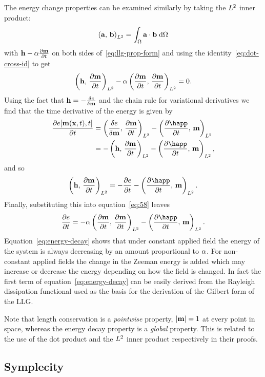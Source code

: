 The energy change properties can be examined similarly by taking the $L^2$ inner product:
\begin{equation}
  \left({\mathbf{a}},\, {\mathbf{b}} \right)_{L^2} = \int_\Omega {\mathbf{a}} \cdot {\mathbf{b}} {\; \text{d}}\Omega
\end{equation}
with $\mathbf{h} - \alpha \frac{\partial \mathbf{m}}{\partial t}$ on both sides of~\eqref{eq:llg-prop-form} and using the identity~\eqref{eq:dot-cross-id} to get
\begin{equation}
  \label{eq:58}
  \left(\mathbf{h},\, \frac{\partial \mathbf{m}}{\partial t} \right)_{L^2} - \alpha \left(\frac{\partial \mathbf{m}}{\partial t},\, \frac{\partial \mathbf{m}}{\partial t} \right)_{L^2} = 0.
\end{equation}
Using the fact that $\mathbf{h} = -\frac{\delta e}{\delta \mathbf{m}}$ and the chain rule for variational derivatives\cite{??ds} we find that the time derivative of the energy is given by
\begin{align*}
  \pd{\e[\mv(\xv, t), t]}{t} &= \ltip{\vd{e}{\mv}}{\dmdt} - \ltip{\pd{\happ}{t}}{\mv} \\
  &= -\ltip{\hv}{\dmdt} - \ltip{\pd{\happ}{t}}{\mv},
\end{align*}
and so
\begin{equation}
  \ltip{\hv}{\dmdt} = -\pd{\e}{t} - \ltip{\pd{\happ}{t}}{\mv}.
\end{equation}
Finally, substituting this into equation~\eqref{eq:58} leaves
\begin{equation}
  \label{eq:energy-decay}
  \pd{\e}{t} = -\dampc \ltip{\dmdt}{\dmdt} - \ltip{\pd{\happ}{t}}{\mv}.
\end{equation}
Equation~\eqref{eq:energy-decay} shows that under constant applied field the energy of the system is always decreasing by an amount proportional to $\alpha$.
For non-constant applied fields the change in the Zeeman energy is added which may increase or decrease the energy depending on how the field is changed. %
In fact the first term of equation~\eqref{eq:energy-decay} can be easily derived from the Rayleigh dissipation functional used as the basis for the derivation of the Gilbert form of the LLG.\cite{Gilbert2004}

Note that length conservation is a \emph{pointwise} property, \ie $\lvert \mathbf{m} \rvert = 1$ at every point in space, whereas the energy decay property is a \emph{global} property.
This is related to the use of the dot product and the $L^2$ inner product respectively in their proofs.


\subsection{Symplecity}

